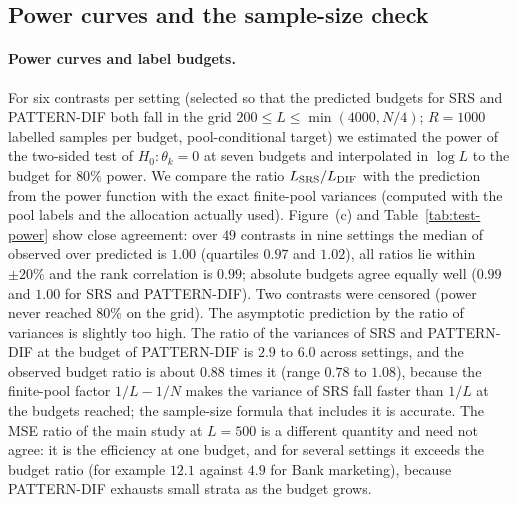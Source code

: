 \subsection{Power curves and the sample-size check}

\paragraph{Power curves and label budgets.} For six contrasts per setting (selected so that the predicted budgets for SRS and PATTERN-DIF both fall in the grid $200\le L\le\min(4000,N/4)$; $R=1000$ labelled samples per budget, pool-conditional target) we estimated the power of the two-sided test of $H_0:\theta_k=0$ at seven budgets and interpolated in $\log L$ to the budget for $80\%$ power. We compare the ratio $L_{\rm SRS}/L_{\rm DIF}$ with the prediction from the power function with the exact finite-pool variances (computed with the pool labels and the allocation actually used). Figure~(c) and Table~\ref{tab:test-power} show close agreement: over $49$ contrasts in nine settings the median of observed over predicted is $1.00$ (quartiles $0.97$ and $1.02$), all ratios lie within $\pm20\%$ and the rank correlation is $0.99$; absolute budgets agree equally well ($0.99$ and $1.00$ for SRS and PATTERN-DIF). Two contrasts were censored (power never reached $80\%$ on the grid). The asymptotic prediction by the ratio of variances is slightly too high. The ratio of the variances of SRS and PATTERN-DIF at the budget of PATTERN-DIF is $2.9$ to $6.0$ across settings, and the observed budget ratio is about $0.88$ times it (range $0.78$ to $1.08$), because the finite-pool factor $1/L-1/N$ makes the variance of SRS fall faster than $1/L$ at the budgets reached; the sample-size formula that includes it is accurate. The MSE ratio of the main study at $L=500$ is a different quantity and need not agree: it is the efficiency at one budget, and for several settings it exceeds the budget ratio (for example $12.1$ against $4.9$ for Bank marketing), because PATTERN-DIF exhausts small strata as the budget grows.

\begin{table}[p]
\centering\footnotesize
\caption{Label budget for $80\%$ power of the two-sided Wald test of $H_0:\theta_k=0$, ratio of SRS to PATTERN-DIF. $V_{\rm SRS}/V_{\rm DIF}$: ratio of exact variances at the budget of PATTERN-DIF (asymptotic prediction, median over contrasts); predicted: from the power function with the exact variance at each budget; observed: from $R=1000$ simulated power curves; Obs./pred.: median of the per-contrast ratio. Contrasts: number selected per setting.}\label{tab:test-power}

\end{table}


